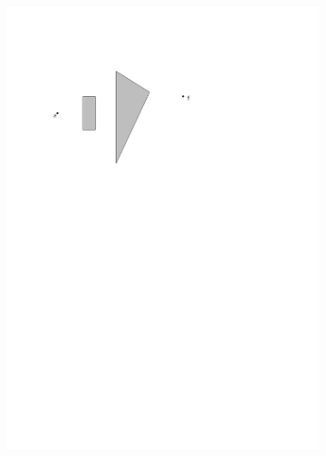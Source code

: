 \begin{figure}[H]
\centering
\begin{subfigure}{.5\textwidth}
  \centering 
  \includegraphics[width=.95\linewidth]{figures/prespm0.pdf}
  \caption{}
  \label{fig:spmplane}
\end{subfigure}%
\begin{subfigure}{.5\textwidth}
  \centering

\end{subfigure}
\end{figure}
